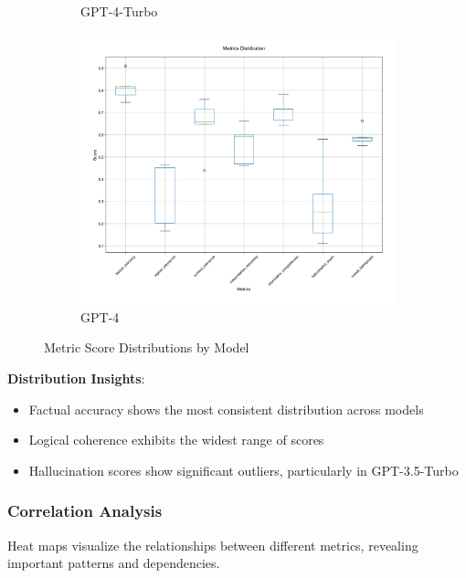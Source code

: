 \begin{figure}[!htbp]
\begin{subfigure}[b]{0.32\textwidth}
    \caption{GPT-4-Turbo}
    \label{fig:metrics_boxplot_gpt4t}
\end{subfigure}
\hfill
\begin{subfigure}[b]{0.32\textwidth}
    \includegraphics[width=\textwidth]{figures/visualization/metrics_boxplot_gpt-4.png}
    \caption{GPT-4}
    \label{fig:metrics_boxplot_gpt4}
\end{subfigure}
\caption{Metric Score Distributions by Model}
\label{fig:metrics_boxplots}
\end{figure}

\textbf{Distribution Insights}:
\begin{itemize}
    \item Factual accuracy shows the most consistent distribution across models
    \item Logical coherence exhibits the widest range of scores
    \item Hallucination scores show significant outliers, particularly in GPT-3.5-Turbo
\end{itemize}

\subsubsection{Correlation Analysis}
Heat maps visualize the relationships between different metrics, revealing important patterns and dependencies.

